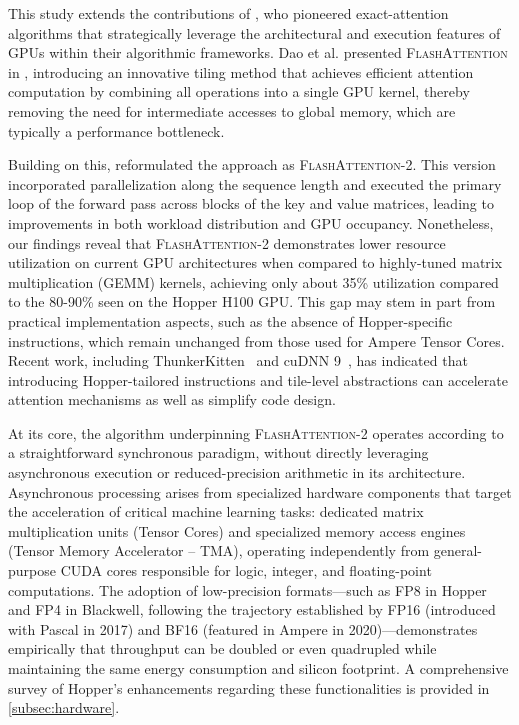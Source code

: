 This study extends the contributions of \citet{dao2022flashattention}, who pioneered exact-attention algorithms that strategically leverage the architectural and execution features of GPUs within their algorithmic frameworks. Dao et al. presented \textsc{FlashAttention} in \citep{dao2022flashattention}, introducing an innovative tiling method that achieves efficient attention computation by combining all operations into a single GPU kernel, thereby removing the need for intermediate accesses to global memory, which are typically a performance bottleneck.

Building on this, \citet{dao2023flashattention2} reformulated the approach as \textsc{FlashAttention-2}. This version incorporated parallelization along the sequence length and executed the primary loop of the forward pass across blocks of the key and value matrices, leading to improvements in both workload distribution and GPU occupancy. Nonetheless, our findings reveal that \textsc{FlashAttention-2} demonstrates lower resource utilization on current GPU architectures when compared to highly-tuned matrix multiplication (GEMM) kernels, achieving only about 35\% utilization compared to the 80-90\% seen on the Hopper H100 GPU. This gap may stem in part from practical implementation aspects, such as the absence of Hopper-specific instructions, which remain unchanged from those used for Ampere Tensor Cores. Recent work, including ThunkerKitten~\citep{spector2024thunder} and cuDNN 9~\citep{cudnn9}, has indicated that introducing Hopper-tailored instructions and tile-level abstractions can accelerate attention mechanisms as well as simplify code design.

At its core, the algorithm underpinning \textsc{FlashAttention-2} operates according to a straightforward synchronous paradigm, without directly leveraging asynchronous execution or reduced-precision arithmetic in its architecture. Asynchronous processing arises from specialized hardware components that target the acceleration of critical machine learning tasks: dedicated matrix multiplication units (Tensor Cores) and specialized memory access engines (Tensor Memory Accelerator -- TMA), operating independently from general-purpose CUDA cores responsible for logic, integer, and floating-point computations. The adoption of low-precision formats—such as FP8 in Hopper and FP4 in Blackwell, following the trajectory established by FP16 (introduced with Pascal in 2017) and BF16 (featured in Ampere in 2020)—demonstrates empirically that throughput can be doubled or even quadrupled while maintaining the same energy consumption and silicon footprint. A comprehensive survey of Hopper’s enhancements regarding these functionalities is provided in \cref{subsec:hardware}. 

